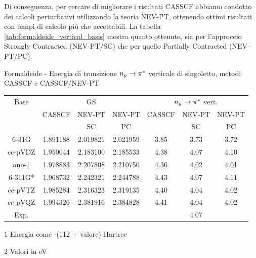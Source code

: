 Di conseguenza, per cercare di migliorare i risultati CASSCF abbiamo
condotto dei calcoli perturbativi utilizzando la teoria NEV-PT, ottenendo
ottimi risultati con tempi di calcolo pi\`u che accettabili. La
tabella \ref{tab:formaldeide_vertical_basis} mostra quanto ottenuto, sia per
l'approccio Strongly Contracted (NEV-PT/SC) che per quello Partially Contracted
(NEV-PT/PC).

\begin{center}
\begin{threeparttable}
\caption{\small Formaldeide - Energia di transizione $n_y \rightarrow \pi^{*}$ verticale di singoletto, metodi CASSCF e CASSCF/NEV-PT}
\label{tab:formaldeide_vertical_basis}
{
\small
\begin{tabular}{|c|ccc|ccc|}
\hline
 Base	& \multicolumn{3}{c}{GS\tnote{1}}				& \multicolumn{3}{c|}{$n_y \rightarrow \pi^{*}$ vert.\tnote{2}} \\
		& CASSCF		& NEV-PT & NEV-PT	& CASSCF		& NEV-PT & NEV-PT \\
		& 				& SC	 & PC		& 				& SC 	& PC \\
\hline
6-31G	& 1.891188		& 2.019821		& 2.021959		& 3.85			& 3.73		& 3.72		    \\
cc-pVDZ	& 1.950044		& 2.183100		& 2.185533		& 4.38			& 4.07 		& 4.10			\\
ano-1	& 1.978883		& 2.207808		& 2.210750		& 4.36			& 4.02 		& 4.01			\\
6-311G*	& 1.968732		& 2.242321		& 2.244788		& 4.43 			& 4.07		& 4.11 			\\
cc-pVTZ & 1.985284 		& 2.316323		& 2.319135		& 4.40			& 4.04 		& 4.02			\\
cc-pVQZ & 1.994326		& 2.381916		& 2.384828		& 4.41			& 4.04		& 4.02			\\
\hline
\hline
Exp.	&				& 				&				& \multicolumn{3}{c|}{4.07} \\
\hline
\end{tabular}
}
\begin{tablenotes}
\small
 \item[1] Energia come -(112 + valore) Hartree
 \item[2] Valori in eV
\end{tablenotes}
\end{threeparttable}
\end{center}

